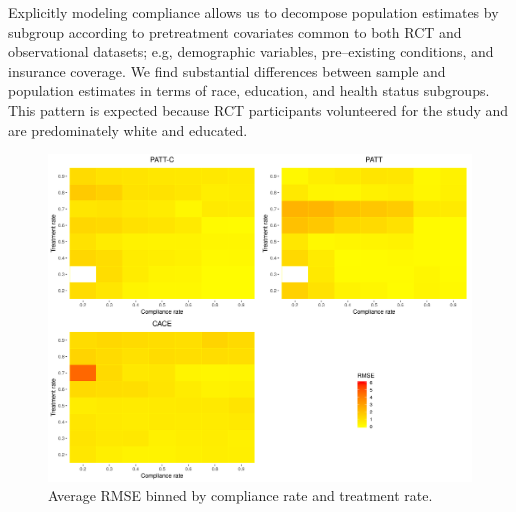 \documentclass[hidelinks,12pt]{article}
\begin{document}
Explicitly modeling compliance allows us to decompose population estimates by subgroup according to pretreatment covariates common to both RCT and observational datasets; e.g, demographic variables, pre--existing conditions, and insurance coverage. We find substantial differences between sample and population estimates in terms of race, education, and health status subgroups. This pattern is expected because RCT participants volunteered for the study and are predominately white and educated.

\pagebreak




\pagebreak
\begin{appendices}
	
\newcommand{\hbAppendixPrefix}{A}
%
\renewcommand{\thefigure}{\hbAppendixPrefix\arabic{figure}}
\setcounter{figure}{0}
\renewcommand{\thetable}{\hbAppendixPrefix\arabic{table}} 
\setcounter{table}{0}
\renewcommand{\theequation}{\hbAppendixPrefix\arabic{equation}} 
\setcounter{equation}{0}


\begin{figure}[htbp]
	\begin{center}
		\includegraphics[width = 1\textwidth]{rmse_ratec_ratet.png}
		\caption{Average RMSE binned by compliance rate and treatment rate.\label{fig:rmse_ratec_ratet}}
	\end{center}
\end{figure}


\end{appendices}
\end{document}
